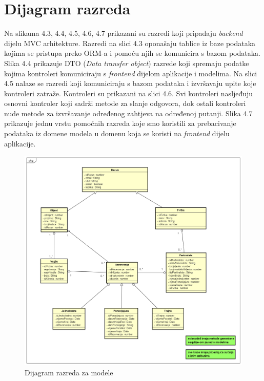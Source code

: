 			\eject
			
			
		\section{Dijagram razreda}
		
		Na  slikama 4.3, 4.4, 4.5, 4.6, 4.7 prikazani su razredi koji pripadaju \textit{backend} dijelu MVC arhitekture. Razredi na slici 4.3 oponašaju tablice iz baze podataka kojima se pristupa preko ORM-a i pomoću njih se komunicira s bazom podataka. Slika 4.4 prikazuje DTO (\textit{Data transfer object}) razrede koji spremaju podatke kojima kontroleri komuniciraju s \textit{frontend} dijelom aplikacije i modelima. Na slici 4.5 nalaze se razredi koji komuniciraju s bazom podataka i izvršavaju upite koje kontroleri zatraže. Kontroleri su prikazani na slici 4.6. Svi kontroleri nasljeđuju osnovni kontroler koji sadrži metode za slanje odgovora, dok ostali kontroleri nude metode za izvršavanje određenog zahtjeva na određenoj putanji. Slika 4.7 prikazuje jednu vrstu pomoćnih razreda koje smo koristili za prebacivanje podataka iz domene modela u domenu koja se koristi na \textit{frontend} dijelu aplikacije.
		
		\begin{figure}[H]
	        \includegraphics[width=1\linewidth]{dijagrami/Dijagram razreda - Models.png}
        	\caption{Dijagram razreda za modele}
        	\label{fig:Dijagram razreda - modeli}
        \end{figure}
    
